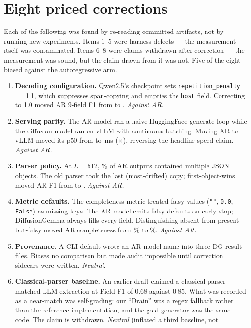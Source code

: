 \section{Eight priced corrections}
\label{app:defects} Each of the following was found by re-reading committed artifacts, not by
running new experiments. Items 1--5 were harness defects --- the measurement
itself was contaminated. Items 6--8 were claims withdrawn after correction
--- the measurement was sound, but the claim drawn from it was not. Five of
the eight biased against the autoregressive arm. \begin{enumerate}
\item \textbf{Decoding configuration.} Qwen2.5's checkpoint sets
\texttt{repetition\_penalty}\,$=$\,1.1, which suppresses span-copying and
empties the \texttt{host} field. Correcting to 1.0 moved AR 9-field F1 from
 to . \emph{Against AR.} \item \textbf{Serving parity.} The AR model ran a naive HuggingFace generate
loop while the diffusion model ran on vLLM with continuous batching. Moving
AR to vLLM moved its p50 from  to \,ms
($\times$), reversing the headline speed claim.
\emph{Against AR.} \item \textbf{Parser policy.} At $L{=}512$, \rambleRate\% of AR outputs
contained multiple JSON objects. The old parser took the last (most-drifted)
copy; first-object-wins moved AR F1 from  to
. \emph{Against AR.} \item \textbf{Metric defaults.} The completeness metric treated falsy values
(\texttt{""}, \texttt{0.0}, \texttt{False}) as missing keys. The AR model
emits falsy defaults on early stop; DiffusionGemma always fills every field.
Distinguishing absent from present-but-falsy moved AR completeness from
\% to \%. \emph{Against AR.} \item \textbf{Provenance.} A CLI default wrote an AR model name into three DG
result files. Biases no comparison but made audit impossible until correction
sidecars were written. \emph{Neutral.} \item \textbf{Classical-parser baseline.} An earlier draft claimed a classical
parser matched LLM extraction at Field-F1 of $0.68$ against $0.85$. What was
recorded as a near-match was self-grading: our ``Drain'' was a regex fallback
rather than the reference implementation, and the gold generator was the same
code. The claim is withdrawn. \emph{Neutral} (inflated a third baseline, not

\end{enumerate}
